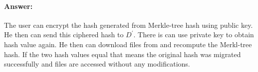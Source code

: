 \documentclass{article}
\begin{document}
    \paragraph{Answer:\newline}
        The user can encrypt the hash generated from Merkle-tree hash using public key. He then can send this ciphered hash to $D^{\prime}$. There is can use private key to obtain hash value again. He then can download files from and recompute the Merkl-tree hash. If the two hash values equal that means the original hash was migrated successfully and files are accessed without any modifications.
    


\end{document}
